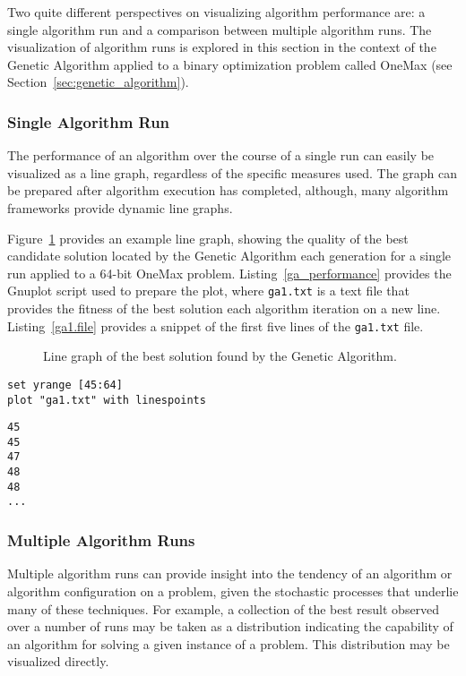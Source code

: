 Two quite different perspectives on visualizing algorithm performance are: a single algorithm run and a comparison between multiple algorithm runs. The visualization of algorithm runs is explored in this section in the context of the Genetic Algorithm applied to a binary optimization problem called OneMax (see Section~\ref{sec:genetic_algorithm}).

\subsubsection{Single Algorithm Run}
The performance of an algorithm over the course of a single run can easily be visualized as a line graph, regardless of the specific measures used. The graph can be prepared after algorithm execution has completed, although, many algorithm frameworks provide dynamic line graphs.

Figure~\ref{plot:ga1} provides an example line graph, showing the quality of the best candidate solution located by the Genetic Algorithm each generation for a single run applied to a 64-bit OneMax problem. Listing~\ref{ga_performance} provides the Gnuplot script used to prepare the plot, where \texttt{ga1.txt} is a text file that provides the fitness of the best solution each algorithm iteration on a new line. Listing~\ref{ga1.file} provides a snippet of the first five lines of the \texttt{ga1.txt} file.

\begin{figure}[htp]
\centering

\caption{Line graph of the best solution found by the Genetic Algorithm.}
\label{plot:ga1}
\end{figure}

\begin{lstlisting}[caption=Gnuplot script for creating a line graph., label=ga_performance]
set yrange [45:64]
plot "ga1.txt" with linespoints
\end{lstlisting}

\begin{lstlisting}[caption=Snippet of the \texttt{ga1.txt} file., label=ga1.file]
45
45
47
48
48
...
\end{lstlisting}

\subsubsection{Multiple Algorithm Runs}
Multiple algorithm runs can provide insight into the tendency of an algorithm or algorithm configuration on a problem, given the stochastic processes that underlie many of these techniques. For example, a collection of the best result observed over a number of runs may be taken as a distribution indicating the capability of an algorithm for solving a given instance of a problem. This distribution may be visualized directly.

